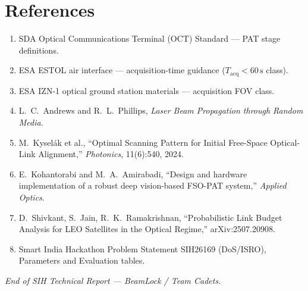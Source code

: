 \documentclass[11pt,a4paper]{article}
\begin{document}
\section*{References}
\begin{enumerate}[leftmargin=1.6em,itemsep=0.3em]
  \item SDA Optical Communications Terminal (OCT) Standard --- PAT stage definitions.
  \item ESA ESTOL air interface --- acquisition-time guidance ($T_{\mathrm{acq}}<60\,\mathrm{s}$ class).
  \item ESA IZN-1 optical ground station materials --- acquisition FOV class.
  \item L.~C.~Andrews and R.~L.~Phillips, \emph{Laser Beam Propagation through Random Media}.
  \item M.~Kysel\'{a}k et al., ``Optimal Scanning Pattern for Initial Free-Space Optical-Link Alignment,'' \emph{Photonics}, 11(6):540, 2024.
  \item E.~Kohantorabi and M.~A.~Amirabadi, ``Design and hardware implementation of a robust deep vision-based FSO-PAT system,'' \emph{Applied Optics}.
  \item D.~Shivkant, S.~Jain, R.~K.~Ramakrishnan, ``Probabilistic Link Budget Analysis for LEO Satellites in the Optical Regime,'' arXiv:2507.20908.
  \item Smart India Hackathon Problem Statement SIH26169 (DoS/ISRO), Parameters and Evaluation tables.
\end{enumerate}

\vspace{1.0em}
\noindent\textit{End of SIH Technical Report --- BeamLock / Team Cadets.}
\end{document}

